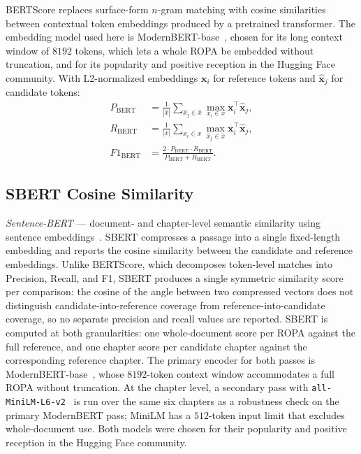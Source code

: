 BERTScore replaces surface-form $n$-gram matching with cosine similarities between contextual token embeddings produced by a pretrained transformer. The embedding model used here is ModernBERT-base~\cite{HFModernBERTBase,Warner2024}, chosen for its long context window of $8192$ tokens, which lets a whole ROPA be embedded without truncation, and for its popularity and positive reception in the Hugging Face community. With L2-normalized embeddings $\mathbf{x}_i$ for reference tokens and $\hat{\mathbf{x}}_j$ for candidate tokens:
\begin{align}
P_{\text{BERT}} &= \frac{1}{|\hat{x}|} \sum_{\hat{x}_j \in \hat{x}} \max_{x_i \in x} \mathbf{x}_i^{\top} \hat{\mathbf{x}}_j, \label{eq:bertscore-p} \\
R_{\text{BERT}} &= \frac{1}{|x|} \sum_{x_i \in x} \max_{\hat{x}_j \in \hat{x}} \mathbf{x}_i^{\top} \hat{\mathbf{x}}_j, \label{eq:bertscore-r} \\
F1_{\text{BERT}} &= \frac{2 \cdot P_{\text{BERT}} \cdot R_{\text{BERT}}}{P_{\text{BERT}} + R_{\text{BERT}}}. \label{eq:bertscore-f1}
\end{align}

\subsection{SBERT Cosine Similarity}

\emph{Sentence-BERT} --- document- and chapter-level semantic similarity using sentence embeddings~\cite{Reimers2019}. SBERT compresses a passage into a single fixed-length embedding and reports the cosine similarity between the candidate and reference embeddings. Unlike BERTScore, which decomposes token-level matches into Precision, Recall, and F1, SBERT produces a single symmetric similarity score per comparison: the cosine of the angle between two compressed vectors does not distinguish candidate-into-reference coverage from reference-into-candidate coverage, so no separate precision and recall values are reported. SBERT is computed at both granularities: one whole-document score per ROPA against the full reference, and one chapter score per candidate chapter against the corresponding reference chapter. The primary encoder for both passes is ModernBERT-base~\cite{HFModernBERTBase}, whose $8192$-token context window accommodates a full ROPA without truncation. At the chapter level, a secondary pass with \texttt{all-MiniLM-L6-v2}~\cite{HFMiniLML6v2} is run over the same six chapters as a robustness check on the primary ModernBERT pass; MiniLM has a $512$-token input limit that excludes whole-document use. Both models were chosen for their popularity and positive reception in the Hugging Face community.

